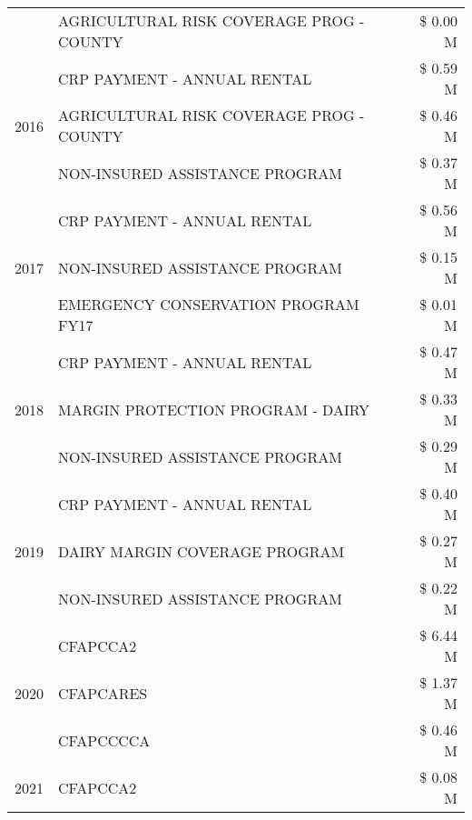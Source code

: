 \begin{tabular}{llr}
 & AGRICULTURAL RISK COVERAGE PROG - COUNTY & \$ 0.00 M \\
\cline{1-3}
\multirow[t]{3}{*}{2016} & CRP PAYMENT - ANNUAL RENTAL & \$ 0.59 M \\
 & AGRICULTURAL RISK COVERAGE PROG - COUNTY & \$ 0.46 M \\
 & NON-INSURED ASSISTANCE PROGRAM & \$ 0.37 M \\
\cline{1-3}
\multirow[t]{3}{*}{2017} & CRP PAYMENT - ANNUAL RENTAL & \$ 0.56 M \\
 & NON-INSURED ASSISTANCE PROGRAM & \$ 0.15 M \\
 & EMERGENCY CONSERVATION PROGRAM FY17 & \$ 0.01 M \\
\cline{1-3}
\multirow[t]{3}{*}{2018} & CRP PAYMENT - ANNUAL RENTAL & \$ 0.47 M \\
 & MARGIN PROTECTION PROGRAM - DAIRY & \$ 0.33 M \\
 & NON-INSURED ASSISTANCE PROGRAM & \$ 0.29 M \\
\cline{1-3}
\multirow[t]{3}{*}{2019} & CRP PAYMENT - ANNUAL RENTAL & \$ 0.40 M \\
 & DAIRY MARGIN COVERAGE PROGRAM & \$ 0.27 M \\
 & NON-INSURED ASSISTANCE PROGRAM & \$ 0.22 M \\
\cline{1-3}
\multirow[t]{3}{*}{2020} & CFAPCCA2 & \$ 6.44 M \\
 & CFAPCARES & \$ 1.37 M \\
 & CFAPCCCCA & \$ 0.46 M \\
\cline{1-3}
2021 & CFAPCCA2 & \$ 0.08 M \\
\cline{1-3}
\bottomrule
\end{tabular}
